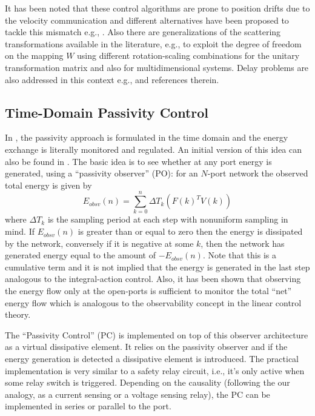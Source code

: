 It has been noted that these control algorithms are prone to position drifts due to the velocity communication and 
different alternatives have been proposed to tackle this mismatch e.g., \cite{yokokohji,chopratro06}. 
Also there are generalizations of the scattering transformations available in the literature, e.g., 
\cite{hirchebuss} to exploit the degree of freedom on the mapping $W$ using different rotation-scaling 
combinations for the unitary transformation matrix and also \cite{stramigioli} for multidimensional systems. 
Delay problems are also addressed in this context e.g., \cite{chopraberes,munirbook,nieslotine97,uedayoshikawa} 
and references therein. 



\subsection{Time-Domain Passivity Control}
In \cite{hannafordryu}, the passivity approach is formulated in the time domain and the energy exchange is literally
monitored and regulated. An initial version of this idea can also be found in \cite{yokokohji}. The basic idea is 
to see whether at any port energy is generated, using a \enquote{passivity observer} (PO): for an $N$-port 
network the observed total energy is given by
\[
E_{obsv}(n) = \sum_{k=0}^n \Delta T_k(F(k)^TV(k))
\]
where $\Delta T_k$ is the sampling period at each step with nonuniform sampling in mind. If 
$E_{obsv}(n) $ is greater than or equal to zero then the energy is dissipated by the network, conversely if
it is negative at some $k$, then the network has generated energy equal to the amount of $-E_{obsv}(n)$. Note that
this is a cumulative term and it is not implied that the energy is generated in the last step analogous to the 
integral-action control. Also, it has been shown that observing the energy flow only at the open-ports is 
sufficient to monitor the total \enquote{net} energy flow which is analogous to the observability concept in the 
linear control theory. 

The \enquote{Passivity Control} (PC) is implemented on top of this observer architecture as a virtual dissipative 
element. It relies on the passivity observer and if the energy generation is detected a dissipative element is 
introduced. The practical implementation is very similar to a safety relay circuit, i.e., it's only active when 
some relay switch is triggered. Depending on the causality (following the our analogy, as a current sensing or a 
voltage sensing relay), the PC can be implemented in series or parallel to the port. 

